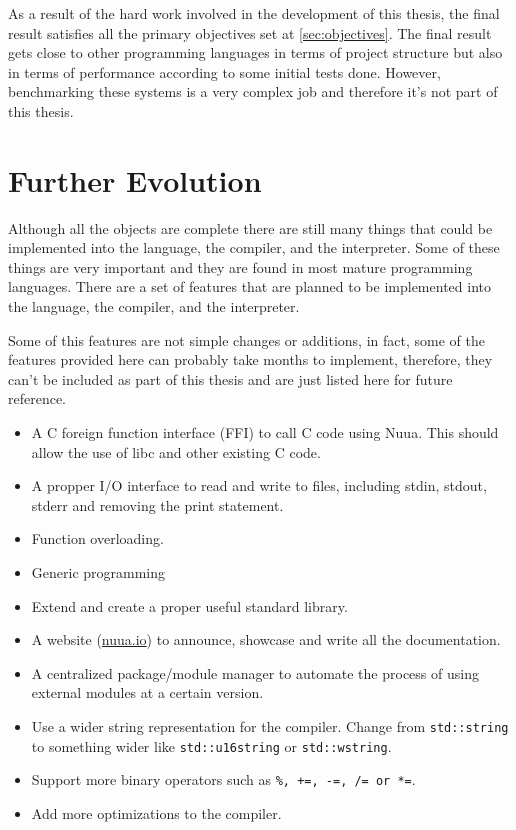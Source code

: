 As a result of the hard work involved in the development of this thesis, the final result satisfies all the primary objectives set at \autoref{sec:objectives}.
The final result gets close to other programming languages in terms of project structure but also in terms of performance according to some initial
tests done. However, benchmarking these systems is a very complex job and therefore it's not part of this thesis.

\section{Further Evolution}
\label{sec:forthcoming}

Although all the objects are complete there are still many things that could be implemented into the language, the compiler, and the interpreter.
Some of these things are very important and they are found in most mature programming languages. There are a set of features that are planned to be
implemented into the language, the compiler, and the interpreter.

Some of this features are not simple changes or additions, in fact, some of the features provided here can probably take months to implement,
therefore, they can't be included as part of this thesis and are just listed here for future reference.

\begin{itemize}
    \item A C foreign function interface (FFI) to call C code using Nuua. This should allow the use of libc and other existing C code.
    \item A propper I/O interface to read and write to files, including stdin, stdout, stderr and removing the print statement.
    \item Function overloading.
    \item Generic programming
    \item Extend and create a proper useful standard library.
    \item A website (\href{https://nuua.io}{nuua.io}) to announce, showcase and write all the documentation.
    \item A centralized package/module manager to automate the process of using external modules at a certain version.
    \item Use a wider string representation for the compiler. Change from \texttt{std::string} to something wider like
        \texttt{std::u16string} or \texttt{std::wstring}.
    \item Support more binary operators such as \texttt{\%, +=, -=, /= or *=}.
    \item Add more optimizations to the compiler.
\end{itemize}
